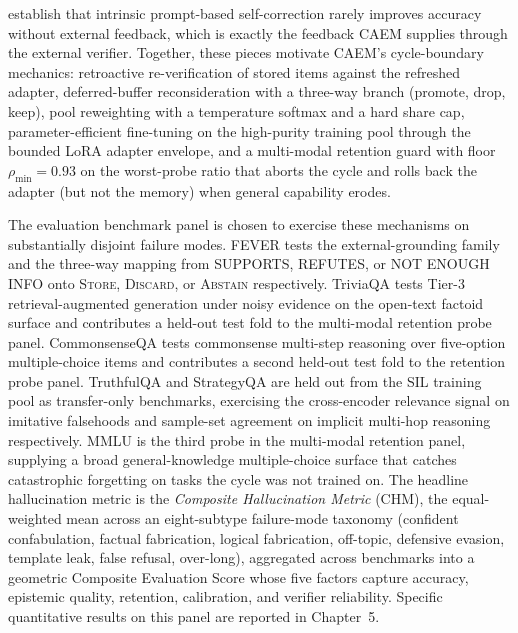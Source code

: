 \cite{kamoi-etal-2024-llms} establish that intrinsic prompt-based self-correction rarely improves accuracy without external feedback, which is exactly the feedback CAEM supplies through the external verifier. Together, these pieces motivate CAEM's cycle-boundary mechanics: retroactive re-verification of stored items against the refreshed adapter, deferred-buffer reconsideration with a three-way branch (promote, drop, keep), pool reweighting with a temperature softmax and a hard share cap, parameter-efficient fine-tuning on the high-purity training pool through the bounded LoRA adapter envelope, and a multi-modal retention guard with floor $\rho_{\min} = 0.93$ on the worst-probe ratio that aborts the cycle and rolls back the adapter (but not the memory) when general capability erodes.

The evaluation benchmark panel is chosen to exercise these mechanisms on substantially disjoint failure modes. FEVER \cite{thorne-etal-2018-fever} tests the external-grounding family and the three-way mapping from SUPPORTS, REFUTES, or NOT ENOUGH INFO onto \textsc{Store}, \textsc{Discard}, or \textsc{Abstain} respectively. TriviaQA \cite{joshi-etal-2017-triviaqa} tests Tier-3 retrieval-augmented generation under noisy evidence on the open-text factoid surface and contributes a held-out test fold to the multi-modal retention probe panel. CommonsenseQA \cite{talmor-etal-2019-commonsenseqa} tests commonsense multi-step reasoning over five-option multiple-choice items and contributes a second held-out test fold to the retention probe panel. TruthfulQA \cite{lin-etal-2022-truthfulqa} and StrategyQA \cite{10.1162/tacl_a_00370} are held out from the SIL training pool as transfer-only benchmarks, exercising the cross-encoder relevance signal on imitative falsehoods and sample-set agreement on implicit multi-hop reasoning respectively. MMLU \cite{hendrycks2021measuring} is the third probe in the multi-modal retention panel, supplying a broad general-knowledge multiple-choice surface that catches catastrophic forgetting on tasks the cycle was not trained on. The headline hallucination metric is the \emph{Composite Hallucination Metric} (CHM), the equal-weighted mean across an eight-subtype failure-mode taxonomy (confident confabulation, factual fabrication, logical fabrication, off-topic, defensive evasion, template leak, false refusal, over-long), aggregated across benchmarks into a geometric Composite Evaluation Score whose five factors capture accuracy, epistemic quality, retention, calibration, and verifier reliability. Specific quantitative results on this panel are reported in Chapter~5.

